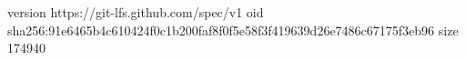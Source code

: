 version https://git-lfs.github.com/spec/v1
oid sha256:91e6465b4c610424f0c1b200faf8f0f5e58f3f419639d26e7486c67175f3eb96
size 174940
